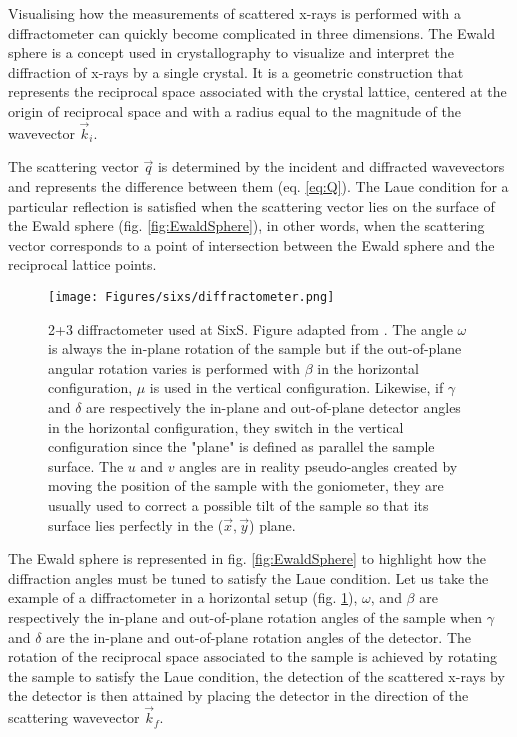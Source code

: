 Visualising how the measurements of scattered x-rays is performed with a diffractometer can quickly become complicated in three dimensions.
The Ewald sphere is a concept used in crystallography to visualize and interpret the diffraction of x-rays by a single crystal.
It is a geometric construction that represents the reciprocal space associated with the crystal lattice, centered at the origin of reciprocal space and with a radius equal to the magnitude of the wavevector $\vec{k}_i$.

The scattering vector $\vec{q}$ is determined by the incident and diffracted wavevectors and represents the difference between them (eq. \ref{eq:Q}).
The Laue condition for a particular reflection is satisfied when the scattering vector lies on the surface of the Ewald sphere (fig. \ref{fig:EwaldSphere}), in other words, when the scattering vector corresponds to a point of intersection between the Ewald sphere and the reciprocal lattice points.

\begin{figure}[!htb]
    \centering
    \texttt{[image: Figures/sixs/diffractometer.png]}
    \caption{
    2+3 diffractometer used at SixS. Figure adapted from \cite{Schleputz2011}.
    The angle $\omega$ is always the in-plane rotation of the sample but if the out-of-plane angular rotation varies is performed with $\beta$ in the horizontal configuration, $\mu$ is used in the vertical configuration.
    Likewise, if $\gamma$ and $\delta$ are respectively the in-plane and out-of-plane detector angles in the horizontal configuration, they switch in the vertical configuration since the "plane" is defined as parallel the sample surface.
    The $u$ and $v$ angles are in reality pseudo-angles created by moving the position of the sample with the goniometer, they are usually used to correct a possible tilt of the sample so that its surface lies perfectly in the ($\vec{x}, \vec{y}$) plane.
    }
    \label{fig:Diffractometer}
\end{figure}

The Ewald sphere is represented in fig. \ref{fig:EwaldSphere} to highlight how the diffraction angles must be tuned to satisfy the Laue condition.
Let us take the example of a diffractometer in a horizontal setup (fig. \ref{fig:Diffractometer}), $\omega$, and $\beta$ are respectively the in-plane and out-of-plane rotation angles of the sample when $\gamma$ and $\delta$ are the in-plane and out-of-plane rotation angles of the detector.
The rotation of the reciprocal space associated to the sample is achieved by rotating the sample to satisfy the Laue condition, the detection of the scattered x-rays by the detector is then attained by placing the detector in the direction of the scattering wavevector $\vec{k}_f$.

